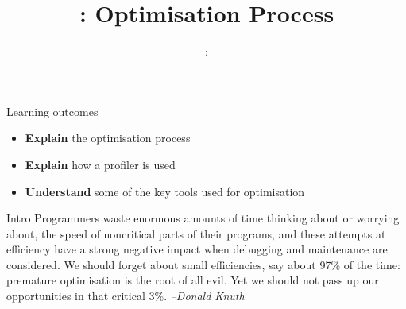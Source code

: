 \usepackage{../../beamerthemeFalmouthGamesAcademy}
\usepackage{multimedia}
\graphicspath{ {../../} }


\usepackage[normalem]{ulem}
\usepackage{wasysym}

\usepackage{pdfpages}

\usetikzlibrary{arrows,automata}




	\title{\sessionnumber: Optimisation Process}
	\subtitle{\modulecode: \moduletitle}
	
	\frame{\titlepage} 

\begin{frame}{Learning outcomes}
\begin{itemize}
	\item \textbf{Explain} the optimisation process
	\item \textbf{Explain} how a profiler is used
	\item \textbf{Understand} some of the key tools used for optimisation
\end{itemize}
\end{frame}

\begin{frame}{Intro}
	Programmers waste enormous amounts of time thinking about or worrying
	about, the speed of noncritical parts of their programs, and these attempts
	at efficiency have a strong negative impact when debugging and
	maintenance are considered. We should forget about small efficiencies, say
	about 97\% of the time: premature optimisation is the root of all evil. Yet we
	should not pass up our opportunities in that critical 3\%. \textit{--Donald Knuth}
\end{frame}






\frame{\partpage}


